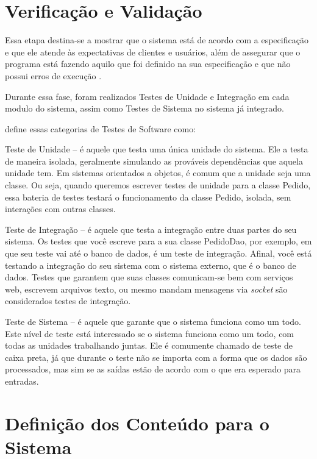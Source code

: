 \section{Verificação e Validação}
Essa etapa destina-se a mostrar que o sistema está de acordo com a especificação e que ele atende às expectativas de clientes e usuários,  
al\'em de assegurar que o  programa está fazendo aquilo que foi definido na sua especificação e que não possui  erros  de  
execução \cite{aguiar2012requisitos}. 

Durante essa fase, foram realizados Testes de Unidade e Integra\c{c}\~ao em cada modulo do sistema, assim como Testes de Sistema no 
sistema j\'a integrado.

 define essas categorias de Testes de Software como:

\begin{alineascomponto}
	\item Teste de Unidade -- é aquele que testa uma única unidade do sistema. Ele a testa de maneira isolada, geralmente simulando as 
prováveis dependências que aquela unidade tem. Em sistemas orientados a objetos, é comum que a unidade seja uma classe. Ou seja, quando 
queremos escrever testes de unidade para a classe Pedido, essa bateria de testes testará o funcionamento da classe Pedido, 
isolada, sem interações com outras classes.
	\item  Teste de Integração -- é aquele que testa a integração entre duas partes do seu sistema. Os testes que você escreve para a sua 
classe PedidoDao, por exemplo, em que seu teste vai até o banco de dados, é um teste de integração. Afinal, você está testando a integração 
do seu sistema com o sistema externo, que é o banco de dados. Testes que garantem que suas classes comunicam-se bem 
com serviços web, escrevem arquivos texto, ou mesmo mandam mensagens via \textit{socket} são considerados testes de integração.
	\item Teste de Sistema -- \'e aquele que garante que o sistema funciona como um todo. Este 
nível de teste está interessado se o sistema funciona como um todo, com todas as 
unidades trabalhando juntas. Ele é comumente chamado de teste de caixa preta, já 
que durante o teste n\~ao se importa com a forma que os dados s\~ao processados, mas sim se as sa\'idas est\~ao de acordo com o que era esperado para entradas. 
\end{alineascomponto}

\section{Definição dos Conteúdo para o Sistema}

